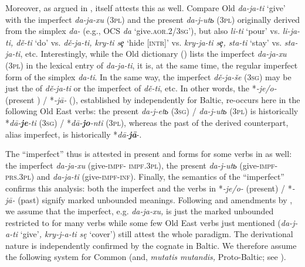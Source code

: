 \documentclass[output=paper]{langsci/langscibook}
\begin{document}
Moreover, as argued in \citet[314]{Seržant2008},  itself attests this  as well. Compare Old  \textit{da-ja-ti} ‘give’ with the imperfect \textit{da-ja-xu} (\textsc{3pl}) and the present \textit{da-j-ut}\textit{ь} (\textsc{3pl}) originally derived from the simplex  \textit{da-} (e.g., OCS \textit{da} ‘give.\textsc{aor.2/3sg}’), but also \textit{li-ti} ‘pour’ vs. \textit{li-ja-ti, dě-ti} ‘do’ vs. \textit{dě-ja-ti, kry-ti sȩ} ‘hide [\textsc{intr}]’ vs. \textit{kry-ja-ti sȩ, sta-ti} ‘stay’ vs. \textit{sta-ja-ti}, etc. Interestingly, while the Old  dictionary (\citealt[635]{Sreznevskij1893-1912}) lists the imperfect \textit{da-ja-xu} (\textsc{3pl}) in the lexical entry of \textit{da-ja-ti}, it is, at the same time, the regular imperfect form of the simplex \textit{da-ti}. In the same way, the imperfect \textit{dě-ja-še} (\textsc{3sg}) may be just the  of \textit{dě-ja-ti} or the imperfect of \textit{dě-ti}, etc. In other words, the  *\textit{-je/o-} (present ) / *\textit{-jā-} (), established by \citet{Ostrowski2006} independently for Baltic, re-occurs here in the following Old East  verbs: the present \textit{da-j-et}\textit{ь} (\textsc{3sg}) / \textit{da-j-ut}\textit{ь} (\textsc{3pl}) is historically *\textit{dā-\textbf{{je}}-ti} (\textsc{3sg}) / *\textit{dā-\textbf{{jo}}-nti} (\textsc{3pl}), whereas the past of the derived  counterpart, alias imperfect, is historically *\textit{dā-\textbf{jā}}-.

The “imperfect” thus is attested in present  and  forms for some verbs in  as well: the imperfect \textit{da-ja-xu} (give-\textsc{impf- impf.3pl}), the present \textit{da-j-ut}\textit{ь} (give-\textsc{impf- prs.3pl}) and  \textit{da-ja-ti} (give-\textsc{impf-inf}). Finally, the semantics of the “imperfect” confirms this analysis: both the imperfect and the verbs in *\textit{-je/o-} (present) / *\textit{-jā-} (past) signify marked unbounded meanings. Following \citet{Ostrowski2006} and amendments by \citet{Seržant2008}, we assume that the  imperfect, e.g. \textit{da-ja-xu,} is just the marked unbounded  restricted to  for many verbs while some few Old East  verbs just mentioned (\textit{da-j-a-ti} ‘give’\textit{, kry-j-a-ti sę} ‘cover’) still attest the whole paradigm. The derivational nature is independently confirmed by the cognate  in Baltic. We therefore assume the following system for Common  (and, \textit{mutatis mutandis,} Proto-Baltic; see ).
\end{document}
